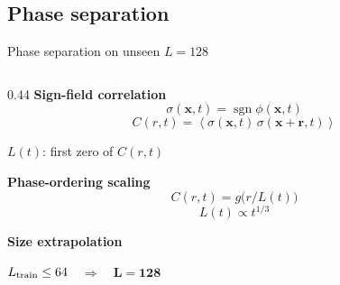 \documentclass[11pt,t]{beamer}
\newcommand{\kb}[1]{{\bfseries\color{Kleinblue} #1}}
\begin{document}
\subsection{Phase separation}
\begin{frame}{Phase separation on unseen $L=128$}
  \begin{columns}[T]
    \begin{column}{0.44\textwidth}
      \kb{Sign-field correlation}
      \small
      \begin{equation*}
        \sigma(\bm{x},t)=\operatorname{sgn}\phi(\bm{x},t)
      \end{equation*}
      \begin{equation*}
        C(r,t)=\left\langle\sigma(\bm{x},t)\,\sigma(\bm{x}+\bm{r},t)\right\rangle
      \end{equation*}

      $L(t)$: first zero of $C(r,t)$

      \kb{Phase-ordering scaling}
      \begin{equation*}
        C(r,t)=g\big(r/L(t)\big)
      \end{equation*}
      \begin{equation*}
        L(t)\propto t^{1/3}
      \end{equation*}

      \kb{Size extrapolation}

      $L_{\rm train}\le64$\ \ {$\Longrightarrow$}\ \ \alert{$\bm{L=128}$}


\end{column}
\end{columns}
\end{frame}
\end{document}
